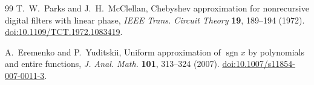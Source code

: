\begin{thebibliography}{99}
T.~W.~Parks and J.~H.~McClellan,
Chebyshev approximation for nonrecursive digital filters with linear phase,
\emph{IEEE Trans. Circuit Theory} \textbf{19}, 189--194 (1972).
\href{https://doi.org/10.1109/TCT.1972.1083419}{doi:10.1109/TCT.1972.1083419}.

A.~Eremenko and P.~Yuditskii,
Uniform approximation of $\operatorname{sgn}x$ by polynomials and entire functions,
\emph{J. Anal. Math.} \textbf{101}, 313--324 (2007).
\href{https://doi.org/10.1007/s11854-007-0011-3}{doi:10.1007/s11854-007-0011-3}.

\end{thebibliography}
